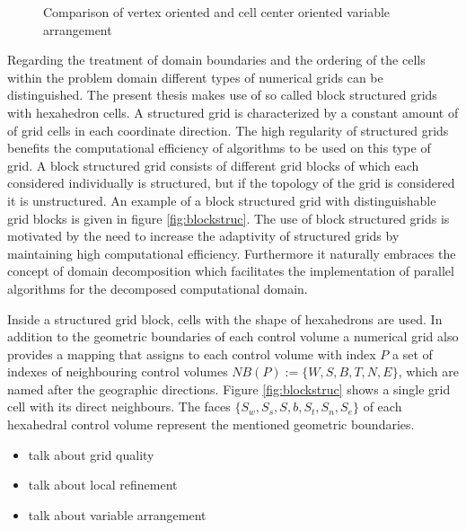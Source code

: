   \begin{figure}
     \label{fig:cellvertex}
      \qquad
      \caption{Comparison of vertex oriented and cell center oriented variable arrangement}
  \end{figure}

    Regarding the treatment of domain boundaries and the ordering of the cells within the problem domain different types of numerical grids can be distinguished. The present thesis makes use of so called block structured grids with hexahedron cells. A structured grid is characterized by a constant amount of of grid cells in each coordinate direction. The high regularity of structured grids benefits the computational efficiency of algorithms to be used on this type of grid. A block structured grid consists of different grid blocks of which each considered individually is structured, but if the topology of the grid is considered it is unstructured. An example of a block structured grid with distinguishable grid blocks is given in figure \ref{fig:blockstruc}. The use of block structured grids is motivated by the need to increase the adaptivity of structured grids by maintaining high computational efficiency. Furthermore it naturally embraces the concept of domain decomposition which facilitates the implementation of parallel algorithms for the decomposed computational domain.

    Inside a structured grid block, cells with the shape of hexahedrons are used. In addition to the geometric boundaries of each control volume a numerical grid also provides a mapping that assigns to each control volume with index \(P\) a set of indexes of neighbouring control volumes \(NB(P):=\{W,S,B,T,N,E\}\), which are named after the geographic directions. Figure \ref{fig:blockstruc} shows a single grid cell with its direct neighbours. The faces \(\{S_w,S_s,S,b,S_t,S_n,S_e\}\) of each hexahedral control volume represent the mentioned geometric boundaries. 

    \begin{itemize}
      \item talk about grid quality
      \item talk about local refinement
      \item talk about variable arrangement
    \end{itemize}

